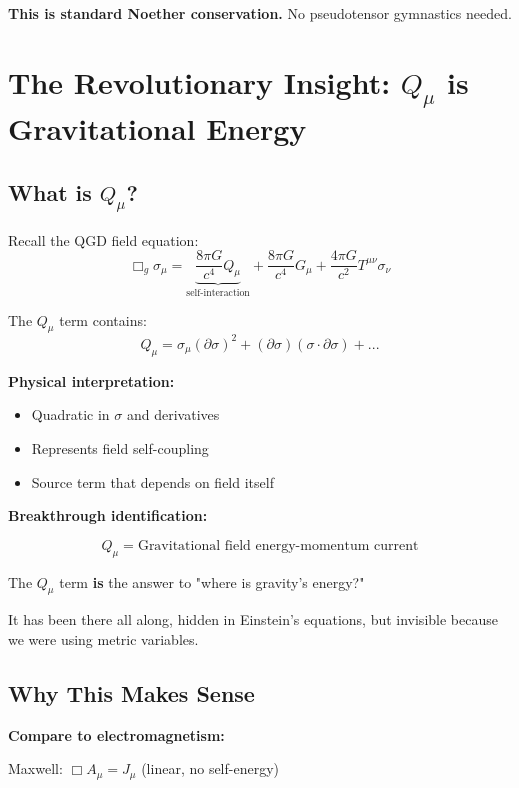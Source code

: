 \documentclass[11pt,a4paper]{article}
\theoremstyle{definition}
\theoremstyle{remark}
\begin{document}
	\textbf{This is standard Noether conservation.} No pseudotensor gymnastics needed.
	
	\section{The Revolutionary Insight: $Q_\mu$ is Gravitational Energy}
	
	\subsection{What is $Q_\mu$?}
	
	Recall the QGD field equation:
	\begin{equation}
		\Box_g\sigma_\mu = \underbrace{\frac{8\pi G}{c^4}Q_\mu}_{\text{self-interaction}} + \frac{8\pi G}{c^4}G_\mu + \frac{4\pi G}{c^2}T^{\mu\nu}\sigma_\nu
	\end{equation}
	
	The $Q_\mu$ term contains:
	\begin{equation}
		Q_\mu = \sigma_\mu(\partial\sigma)^2 + (\partial\sigma)(\sigma \cdot \partial\sigma) + ...
	\end{equation}
	
	\textbf{Physical interpretation:}
	\begin{itemize}
		\item Quadratic in $\sigma$ and derivatives
		\item Represents field self-coupling
		\item Source term that depends on field itself
	\end{itemize}
	
		\textbf{Breakthrough identification:}
		
		\begin{equation}
			\boxed{Q_\mu = \text{Gravitational field energy-momentum current}}
		\end{equation}
		
		The $Q_\mu$ term \textbf{is} the answer to "where is gravity's energy?"
		
		It has been there all along, hidden in Einstein's equations, but invisible because we were using metric variables.
	
	\subsection{Why This Makes Sense}
	
	\textbf{Compare to electromagnetism:}
	
	Maxwell: $\Box A_\mu = J_\mu$ (linear, no self-energy)
	
\end{document}
